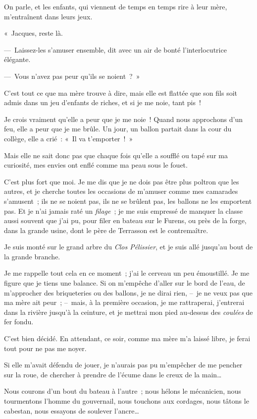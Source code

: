 \documentclass[french,twoside]{book} %
\begin{document}
On parle, et les enfants, qui viennent de temps en temps rire à leur mère, m’entraînent dans leurs jeux.\par
« Jacques, reste là.\par
— Laissez-les s’amuser ensemble, dit avec un air de bonté l’interlocutrice élégante.\par
— Vous n’avez pas peur qu’ils se noient ? »\par
C’est tout ce que ma mère trouve à dire, mais elle est flattée que son fils soit admis dans un jeu d’enfants de riches, et si je me noie, tant pis !\par
Je crois vraiment qu’elle a peur que je me noie ! Quand nous approchons d’un feu, elle a peur que je me brûle. Un jour, un ballon partait dans la cour du collège, elle a crié : « Il va t’emporter ! »\par
Mais elle ne sait donc pas que chaque fois qu’elle a soufflé ou tapé sur ma curiosité, mes envies ont enflé comme ma peau sous le fouet.\par
C’est plus fort que moi. Je me dis que je ne dois pas être plus poltron que les autres, et je cherche toutes les occasions de m’amuser comme mes camarades s’amusent ; ils ne se noient pas, ils ne se brûlent pas, les ballons ne les emportent pas. Et je n’ai jamais raté un \emph{filage} ; je me suis empressé de manquer la classe aussi souvent que j’ai pu, pour filer en bateau sur le Furens, ou près de la forge, dans la grande usine, dont le père de Terrasson est le contremaître.\par
Je suis monté sur le grand arbre du \emph{Clos Pélissier}, et je suis allé jusqu’au bout de la grande branche.\par
Je me rappelle tout cela en ce moment ; j’ai le cerveau un peu émoustillé. Je me figure que je tiens une balance. Si on m’empêche d’aller sur le bord de l’eau, de m’approcher des briqueteries ou des ballons, je ne dirai rien, – je ne veux pas que ma mère ait peur ; – mais, à la première occasion, je me rattraperai, j’entrerai dans la rivière jusqu’à la ceinture, et je mettrai mon pied au-dessus des \emph{coulées} de fer fondu.\par
C’est bien décidé. En attendant, ce soir, comme ma mère m’a laissé libre, je ferai tout pour ne pas me noyer.\par
Si elle m’avait défendu de jouer, je n’aurais pas pu m’empêcher de me pencher sur la roue, de chercher à prendre de l’écume dans le creux de la main…\par
Nous courons d’un bout du bateau à l’autre ; nous hélons le mécanicien, nous tourmentons l’homme du gouvernail, nous touchons aux cordages, nous tâtons le cabestan, nous essayons de soulever l’ancre…\par
\end{document}
